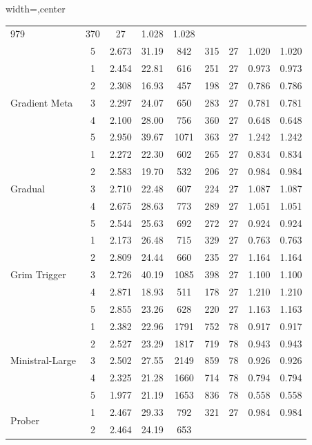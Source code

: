 \begin{table}[htbp]
\begin{adjustbox}{width=\textwidth,center}
\begin{tabular}{|l|c|c|c|c|c|c|c|c|}
979 & 
370 & 
27 & 
1.028 & 
1.028 \\
 & 
5 & 
2.673 & 
31.19 & 
842 & 
315 & 
27 & 
1.020 & 
1.020 \\
\hline
\multirow{5}{*}{Gradient Meta} & 
1 & 
2.454 & 
22.81 & 
616 & 
251 & 
27 & 
0.973 & 
0.973 \\
 & 
2 & 
2.308 & 
16.93 & 
457 & 
198 & 
27 & 
0.786 & 
0.786 \\
 & 
3 & 
2.297 & 
24.07 & 
650 & 
283 & 
27 & 
0.781 & 
0.781 \\
 & 
4 & 
2.100 & 
28.00 & 
756 & 
360 & 
27 & 
0.648 & 
0.648 \\
 & 
5 & 
2.950 & 
39.67 & 
1071 & 
363 & 
27 & 
1.242 & 
1.242 \\
\hline
\multirow{5}{*}{Gradual} & 
1 & 
2.272 & 
22.30 & 
602 & 
265 & 
27 & 
0.834 & 
0.834 \\
 & 
2 & 
2.583 & 
19.70 & 
532 & 
206 & 
27 & 
0.984 & 
0.984 \\
 & 
3 & 
2.710 & 
22.48 & 
607 & 
224 & 
27 & 
1.087 & 
1.087 \\
 & 
4 & 
2.675 & 
28.63 & 
773 & 
289 & 
27 & 
1.051 & 
1.051 \\
 & 
5 & 
2.544 & 
25.63 & 
692 & 
272 & 
27 & 
0.924 & 
0.924 \\
\hline
\multirow{5}{*}{Grim Trigger} & 
1 & 
2.173 & 
26.48 & 
715 & 
329 & 
27 & 
0.763 & 
0.763 \\
 & 
2 & 
2.809 & 
24.44 & 
660 & 
235 & 
27 & 
1.164 & 
1.164 \\
 & 
3 & 
2.726 & 
40.19 & 
1085 & 
398 & 
27 & 
1.100 & 
1.100 \\
 & 
4 & 
2.871 & 
18.93 & 
511 & 
178 & 
27 & 
1.210 & 
1.210 \\
 & 
5 & 
2.855 & 
23.26 & 
628 & 
220 & 
27 & 
1.163 & 
1.163 \\
\hline
\multirow{5}{*}{Ministral-Large} & 
1 & 
2.382 & 
22.96 & 
1791 & 
752 & 
78 & 
0.917 & 
0.917 \\
 & 
2 & 
2.527 & 
23.29 & 
1817 & 
719 & 
78 & 
0.943 & 
0.943 \\
 & 
3 & 
2.502 & 
27.55 & 
2149 & 
859 & 
78 & 
0.926 & 
0.926 \\
 & 
4 & 
2.325 & 
21.28 & 
1660 & 
714 & 
78 & 
0.794 & 
0.794 \\
 & 
5 & 
1.977 & 
21.19 & 
1653 & 
836 & 
78 & 
0.558 & 
0.558 \\
\hline
\multirow{5}{*}{Prober} & 
1 & 
2.467 & 
29.33 & 
792 & 
321 & 
27 & 
0.984 & 
0.984 \\
 & 
2 & 
2.464 & 
24.19 & 
653 & 

\end{tabular}
\end{adjustbox}
\end{table}
